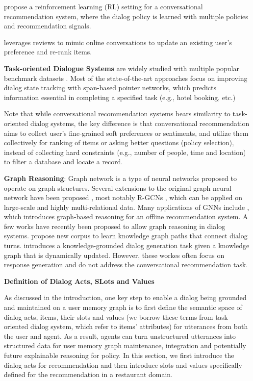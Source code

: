 \cite{sun2018conversational,kang2019recommendation} propose a reinforcement learning (RL) setting for a conversational recommendation system, where the dialog policy is learned with multiple policies and recommendation signals.

\cite{zhang2018towards} leverages reviews to mimic online conversations to update an existing user's preference and re-rank items.

\noindent \textbf{Task-oriented Dialogue Systems} are widely studied with multiple popular benchmark datasets \cite{dstc2, woz, multiwoz, multiwoz2.1,sgd-dst}.
Most of the state-of-the-art approaches \cite{trade,bert-dst-alexa,bert-dst-cmu} focus on improving dialog state tracking with span-based pointer networks, which predicts information essential in completing a specified task (e.g., hotel booking, etc.)

Note that while conversational recommendation systems bears similarity to task-oriented dialog systems, the key difference is that conversational recommendation aims to collect user's fine-grained soft preferences or sentiments, and utilize them collectively for ranking of items or asking better questions (policy selection), instead of collecting hard constraints (e.g., number of people, time and location) to filter a database and locate a record. 

\noindent \textbf{Graph Reasoning}:
Graph network \cite{scarselli2008graph,duvenaud2015convolutional,defferrard2016convolutional,kipf2016semi} is a type of neural networks proposed to operate on graph structures. 
Several extensions to the original graph neural network have been proposed \cite{li2015gated,pham2017column},
most notably R-GCNs \cite{schlichtkrull2018modeling}, which can be applied on large-scale and highly multi-relational data.
Many applications of GNNs include \cite{Xian2019ReinforcementKG}, which introduces graph-based reasoning for an offline recommendation system.
A few works have recently been proposed to allow graph reasoning in dialog systems.
\cite{Moon+19a, Moon+19b} propose new corpus to learn knowledge graph paths that connect dialog turns.
\cite{tuan-etal-2019-dykgchat} introduces a knowledge-grounded dialog generation task given a knowledge graph that is dynamically updated.
However, these workes often focus on response generation and do not address the conversational recommendation task.


\textbf{Definition of Dialog Acts, SLots and Values}

\label{chap6:sec:form}
As discussed in the introduction, one key step to enable a dialog being grounded and maintained on a user memory graph is to first define the semantic space of dialog acts, items, their slots and values (we borrow these terms from task-oriented dialog system, which refer to items' attributes) for utterances from both the user and agent.
As a result, agents can turn unstructured utterances into structured data for user memory graph maintenance, integration and potentially future explainable reasoning for policy.
In this section, we first introduce the dialog acts for recommendation and then introduce slots and values specifically defined for the recommendation in a restaurant domain.

